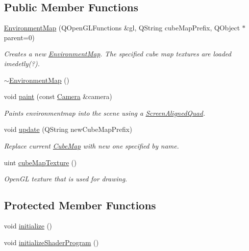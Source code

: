 \subsection*{Public Member Functions}
\begin{DoxyCompactItemize}
\item 
\hyperlink{class_environment_map_a54b674f88e757c7293abd2f52f518183}{Environment\+Map} (Q\+Open\+G\+L\+Functions \&gl, Q\+String cube\+Map\+Prefix, Q\+Object $\ast$parent=0)
\begin{DoxyCompactList}\small\item\em Creates a new \hyperlink{class_environment_map}{Environment\+Map}. The specified cube map textures are loaded imedetly(?). \end{DoxyCompactList}\item 
\hyperlink{class_environment_map_a77218340957b486754db0ff73f37c8da}{$\sim$\+Environment\+Map} ()
\item 
void \hyperlink{class_environment_map_a49b3996bb58c2e39befdea946402bbdd}{paint} (const \hyperlink{class_camera}{Camera} \&camera)
\begin{DoxyCompactList}\small\item\em Paints environmentmap into the scene using a \hyperlink{class_screen_aligned_quad}{Screen\+Aligned\+Quad}. \end{DoxyCompactList}\item 
void \hyperlink{class_environment_map_a700a5d20db46b88e2ad09675cfeb5a7f}{update} (Q\+String new\+Cube\+Map\+Prefix)
\begin{DoxyCompactList}\small\item\em Replace current \hyperlink{class_cube_map}{Cube\+Map} with new one specified by name. \end{DoxyCompactList}\item 
uint \hyperlink{class_environment_map_a49de5c6028aaf39124e6f6177aeff3db}{cube\+Map\+Texture} ()
\begin{DoxyCompactList}\small\item\em Open\+G\+L texture that is used for drawing. \end{DoxyCompactList}\end{DoxyCompactItemize}
\subsection*{Protected Member Functions}
\begin{DoxyCompactItemize}
\item 
void \hyperlink{class_environment_map_a718a9c79e383200989d22a580520fe80}{initialize} ()
\item 
void \hyperlink{class_environment_map_af348237ba84d4ac5ca45448b4a605357}{initialize\+Shader\+Program} ()
\end{DoxyCompactItemize}

